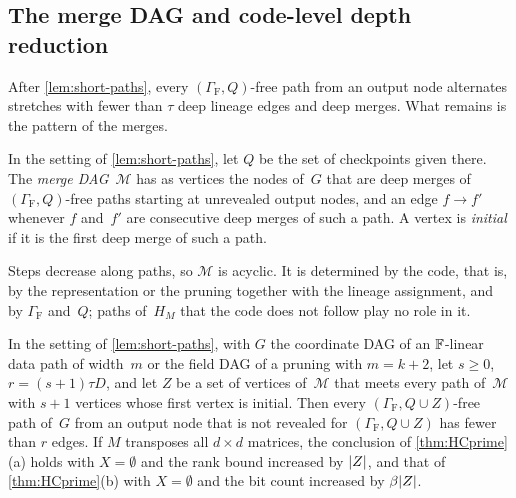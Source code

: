 \subsection{The merge DAG and code-level depth reduction}\label{sec:hop-merge}

After \cref{lem:short-paths}, every $(\Gamma_{\mathrm F},Q)$-free path from an output node alternates stretches with
fewer than $\tau$ deep lineage edges and deep merges. What remains is the pattern of the merges.

\begin{definition}\label{def:merge-dag}
In the setting of \cref{lem:short-paths}, let $Q$ be the set of checkpoints given there. The \emph{merge DAG}~$\mathcal M$
has as vertices the nodes of~$G$ that are deep merges of $(\Gamma_{\mathrm F},Q)$-free paths starting at unrevealed output
nodes, and an edge $f\to f'$ whenever $f$ and~$f'$ are consecutive deep merges of such a path. A vertex is
\emph{initial} if it is the first deep merge of such a path.
\end{definition}

Steps decrease along paths, so $\mathcal M$ is acyclic. It is determined by the code, that is, by the representation or
the pruning together with the lineage assignment, and by $\Gamma_{\mathrm F}$ and~$Q$; paths of~$H_M$ that the code does
not follow play no role in it.

\begin{proposition}\label{prop:merge-reduction}
In the setting of \cref{lem:short-paths}, with $G$ the coordinate DAG of an $\mathbb{F}$-linear data path of width~$m$ or the
field DAG of a pruning with $m=k+2$, let $s\ge0$, $r=(s+1)\tau D$, and let $Z$ be a set of vertices of~$\mathcal M$
that meets every path of~$\mathcal M$ with $s+1$ vertices whose first vertex is initial. Then every
$(\Gamma_{\mathrm F},Q\cup Z)$-free path of~$G$ from an output node that is not revealed for
$(\Gamma_{\mathrm F},Q\cup Z)$ has fewer than $r$ edges. If $M$ transposes all $d\times d$ matrices, the conclusion of
\cref{thm:HCprime}(a) holds with $X=\emptyset$ and the rank bound increased by $\lvert Z \rvert$, and that of
\cref{thm:HCprime}(b) with $X=\emptyset$ and the bit count increased by $\beta\lvert Z \rvert$.
\end{proposition}

